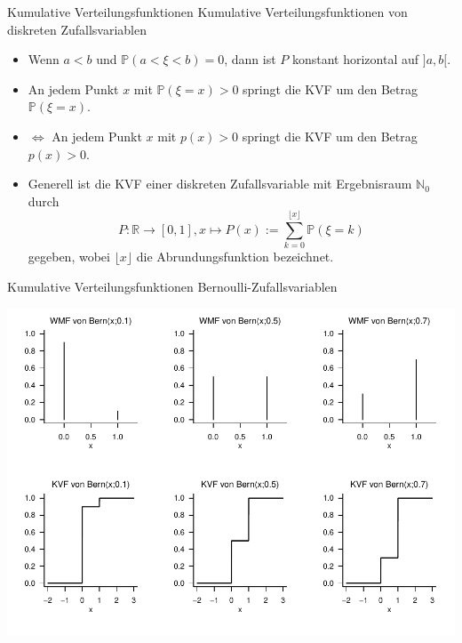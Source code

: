 \documentclass[
  8pt,
  ignorenonframetext,
]{beamer}
\begin{document}
\begin{frame}{Kumulative Verteilungsfunktionen}
\protect\hypertarget{kumulative-verteilungsfunktionen-5}{}
Kumulative Verteilungsfunktionen von diskreten Zufallsvariablen
 \small

\begin{itemize}
\item Wenn $a < b$ und $\mathbb{P}(a < \xi < b) = 0$, dann ist $P$ konstant horizontal auf $]a,b[$.
\item An jedem Punkt $x$ mit $\mathbb{P}(\xi=x)>0$ springt die KVF um den Betrag $\mathbb{P}(\xi=x)$.
\item $\Leftrightarrow$ An jedem Punkt $x$ mit $p(x)>0$ springt die KVF um den Betrag $p(x)>0$.
\item Generell ist die KVF einer diskreten Zufallsvariable mit Ergebnisraum $\mathbb{N}_0$ durch
\begin{equation}
P : \mathbb{R} \to [0,1], x \mapsto P(x) := \sum_{k=0}^{\lfloor x  \rfloor} \mathbb{P}(\xi = k)
\end{equation}
gegeben, wobei $\lfloor x \rfloor$ die Abrundungsfunktion bezeichnet.
\end{itemize}
\end{frame}

\begin{frame}{Kumulative Verteilungsfunktionen}
\protect\hypertarget{kumulative-verteilungsfunktionen-6}{}
Bernoulli-Zufallsvariablen \vspace{.2cm}

\begin{center}\includegraphics[width=0.8\linewidth]{4_Abbildungen/wtfi_4_bernoulliverteilung_kvf} \end{center}
\end{frame}
\end{document}
